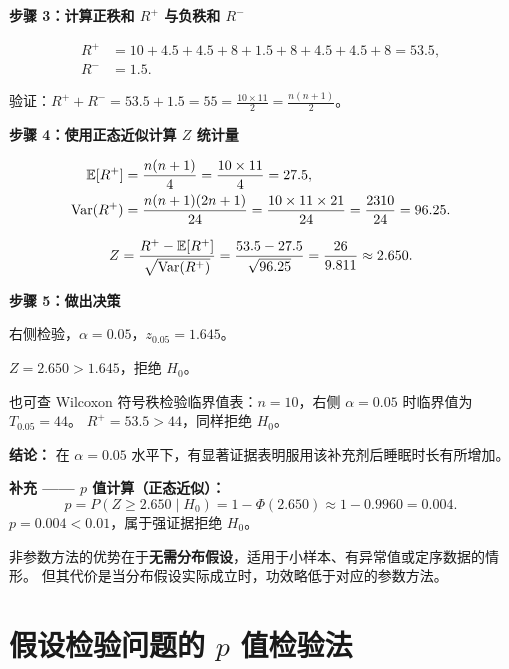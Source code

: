 \begin{example}
\textbf{步骤 3：计算正秩和 $R^+$ 与负秩和 $R^-$}

\begin{align}
    R^+ &= 10 + 4.5 + 4.5 + 8 + 1.5 + 8 + 4.5 + 4.5 + 8
         = 53.5, \\
    R^- &= 1.5.
\end{align}

验证：$R^+ + R^- = 53.5 + 1.5 = 55 = \frac{10 \times 11}{2} = \frac{n(n+1)}{2}$。\checkmark

\textbf{步骤 4：使用正态近似计算 $Z$ 统计量}

\begin{align}
    \mathbb{E}[R^+] &= \frac{n(n+1)}{4} = \frac{10 \times 11}{4} = 27.5, \\
    \mathrm{Var}(R^+) &= \frac{n(n+1)(2n+1)}{24}
               = \frac{10 \times 11 \times 21}{24}
               = \frac{2310}{24} = 96.25.
\end{align}

\begin{equation}
    Z = \frac{R^+ - \mathbb{E}[R^+]}{\sqrt{\mathrm{Var}(R^+)}}
      = \frac{53.5 - 27.5}{\sqrt{96.25}}
      = \frac{26}{9.811} \approx 2.650.
\end{equation}

\textbf{步骤 5：做出决策}

右侧检验，$\alpha = 0.05$，$z_{0.05} = 1.645$。

$Z = 2.650 > 1.645$，拒绝 $H_0$。

也可查 Wilcoxon 符号秩检验临界值表：$n = 10$，右侧 $\alpha = 0.05$ 时临界值为 $T_{0.05} = 44$。
$R^+ = 53.5 > 44$，同样拒绝 $H_0$。

\textbf{结论：} 在 $\alpha = 0.05$ 水平下，有显著证据表明服用该补充剂后睡眠时长有所增加。

\textbf{补充 —— $p$ 值计算（正态近似）：}
\begin{equation}
    p = P(Z \ge 2.650 \mid H_0)
      = 1 - \Phi(2.650)
      \approx 1 - 0.9960 = 0.004.
\end{equation}
$p = 0.004 < 0.01$，属于强证据拒绝 $H_0$。
\end{example}

\begin{remark}
非参数方法的优势在于\textbf{无需分布假设}，适用于小样本、有异常值或定序数据的情形。
但其代价是当分布假设实际成立时，功效略低于对应的参数方法。
\end{remark}

\section{假设检验问题的 $p$ 值检验法}

